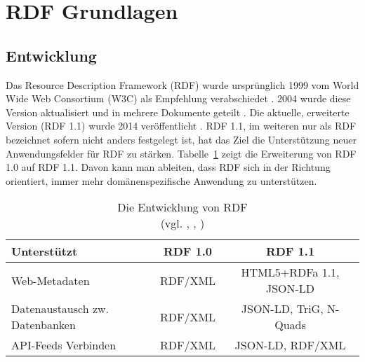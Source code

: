 \section{RDF Grundlagen}
\subsection{Entwicklung}
Das Resource Description Framework (RDF) wurde ursprünglich 1999 vom World Wide Web Consortium (W3C) als Empfehlung verabschiedet \parencite{Lassila:99:RMS}. 2004 wurde diese Version aktualisiert und in mehrere Dokumente geteilt \parencite{Beckett:04:RSS}. Die aktuelle, erweiterte Version (RDF 1.1) wurde 2014 veröffentlicht \parencite{Schreiber:14:RP}. RDF 1.1, im weiteren nur als RDF bezeichnet sofern nicht anders festgelegt ist, hat das Ziel die Unterstützung neuer Anwendungsfelder für RDF zu stärken. Tabelle~\ref{tab:rdf} zeigt die Erweiterung von RDF 1.0 auf RDF 1.1. Davon kann man ableiten, dass RDF sich in der Richtung orientiert, immer mehr domänenspezifische Anwendung zu unterstützen.
\begin{table}[h]
	\centering
	\begin{tabular}{|p{9em}|c|c|}
		\hline \rule[-2ex]{0pt}{5.5ex} Unterstützt & RDF 1.0 & RDF 1.1 \\ 
		\hline \rule[-2ex]{0pt}{5.5ex} Web-Metadaten & RDF/XML & HTML5+RDFa 1.1, JSON-LD\\ 
		\hline \rule[-2ex]{0pt}{5.5ex} Datenaustausch zw. Datenbanken & RDF/XML\footnotemark & JSON-LD, TriG, N-Quads  \\
		\hline \rule[-2ex]{0pt}{5.5ex} API-Feeds Verbinden & RDF/XML\footnotemark[\value{footnote}] & JSON-LD, RDF/XML\\ 
		\hline
	\end{tabular}
	\caption{Die Entwicklung von RDF\\ (vgl. \cite[Abs.~2]{Klyne:04:RDF}, \cite[Abs.~2]{Schreiber:14:RP}, \cite{Wood:14:WNR})}
	\label{tab:rdf}
\end{table}

